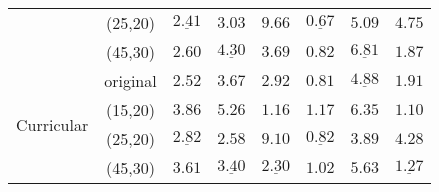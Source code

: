 \documentclass[nohyperref]{article}
\theoremstyle{plain}
\theoremstyle{definition}
\theoremstyle{remark}
\begin{document}
\begin{table*}
\begin{tabular}{ c | c | ccc | ccc}
                              & (25,20) & $\underline{2.41}$ & $\mathbf{3.03}$ & $9.66$ & $\underline{0.67}$ & $\mathbf{5.09}$  & $4.75$ \\
                              & (45,30) & $2.60$ & $\underline{4.30}$ & $3.69$ & $0.82$ & $\underline{6.81}$ & $1.87$ \\ \hline 
                              & original  & $\mathbf{2.52}$ & $3.67$ & $2.92$ & $\mathbf{0.81}$  & $\underline{4.88}$ & $1.91$  \\
  \multirow{2}{*}{Curricular} & (15,20) & $3.86$ & $5.26$ & $\mathbf{1.16}$  & $1.17$ & $6.35$  & $\mathbf{1.10}$  \\
                              & (25,20) & $\underline{2.82}$ & $\mathbf{2.58}$ & $9.10$ & $\underline{0.82}$ & $\mathbf{3.89}$  & $4.28$ \\
                              & (45,30) & $3.61$ & $\underline{3.40}$ & $\underline{2.30}$ & $1.02$ & $5.63$ & $\underline{1.27}$  \\ \hline 
\end{tabular}
\label{tab:table4}
\end{table*}
\end{document}
